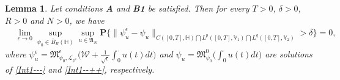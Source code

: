 \documentclass[10pt,a4paper]{amsart}
\newtheorem{lemma}{Lemma}
\begin{document}
\begin{lemma}\label{SCE3}
Let conditions  {\bf A} and {\bf B1}
be satisfied. Then for every $T>0$, $\delta>0$, $R>0$ and $N>0$, we have
\begin{align*}
&\lim_{\epsilon\rightarrow0}\sup_{\psi_{0}\in \overline{B}_{R}(\mathbb{H})}
\sup_{u\in \mathfrak{A}_N}\mathbf{P}\Big\{ \|\psi^\epsilon_u-\psi_u\|_{C([0,T],\mathbb{H}) \bigcap L^p([0,T], \mathbb{V}_1)\bigcap L^q([0,T], \mathbb{V}_2)}>\delta\Big\}=0,
\end{align*}
where $\psi^\epsilon_u=
\mathfrak{M}_{\psi_0,\mathcal{L}_{
\psi^\epsilon}}^\epsilon
\big(\mathcal{W}+\frac{1}{\sqrt{\epsilon}}
\int_0^\cdot u(t)dt\big)$ and $\psi_u=
\mathfrak{M}_{\psi_0}^0
\big(
\int_0^\cdot u(t)dt\big)$ are solutions of \eqref{Int1---} and \eqref{Int1--++}, respectively.
\end{lemma}
\end{document}
